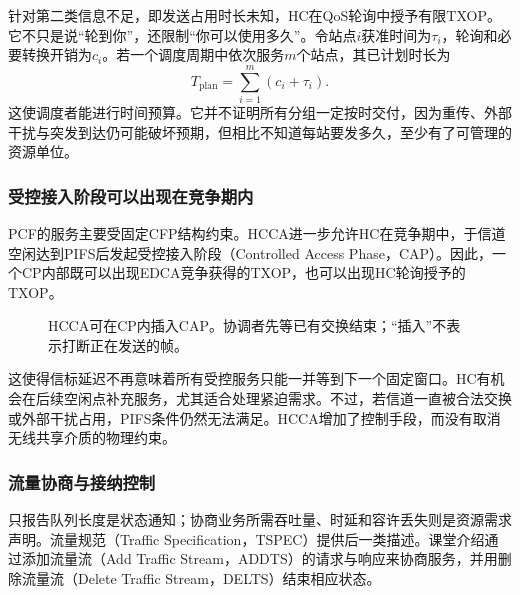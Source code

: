 针对第二类信息不足，即发送占用时长未知，HC在QoS轮询中授予有限TXOP。它不只是说“轮到你”，还限制“你可以使用多久”。令站点$i$获准时间为$\tau_i$，轮询和必要转换开销为$c_i$。若一个调度周期中依次服务$m$个站点，其已计划时长为
\begin{equation}
T_{\mathrm{plan}}=\sum_{i=1}^{m}(c_i+\tau_i).
\end{equation}
这使调度者能进行时间预算。它并不证明所有分组一定按时交付，因为重传、外部干扰与突发到达仍可能破坏预期，但相比不知道每站要发多久，至少有了可管理的资源单位。

\subsubsection{受控接入阶段可以出现在竞争期内}

PCF的服务主要受固定CFP结构约束。HCCA进一步允许HC在竞争期中，于信道空闲达到PIFS后发起受控接入阶段（Controlled Access Phase，CAP）。因此，一个CP内部既可以出现EDCA竞争获得的TXOP，也可以出现HC轮询授予的TXOP。

\begin{figure}[htbp]
\centering
{}
\caption{HCCA可在CP内插入CAP。协调者先等已有交换结束；“插入”不表示打断正在发送的帧。}
\end{figure}

这使得信标延迟不再意味着所有受控服务只能一并等到下一个固定窗口。HC有机会在后续空闲点补充服务，尤其适合处理紧迫需求。不过，若信道一直被合法交换或外部干扰占用，PIFS条件仍然无法满足。HCCA增加了控制手段，而没有取消无线共享介质的物理约束。

\subsubsection{流量协商与接纳控制}

只报告队列长度是状态通知；协商业务所需吞吐量、时延和容许丢失则是资源需求声明。流量规范（Traffic Specification，TSPEC）提供后一类描述。课堂介绍通过添加流量流（Add Traffic Stream，ADDTS）的请求与响应来协商服务，并用删除流量流（Delete Traffic Stream，DELTS）结束相应状态。

